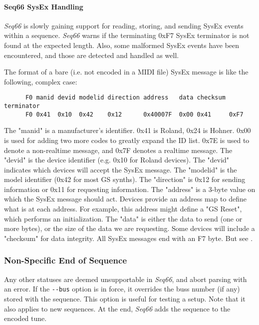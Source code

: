 \paragraph{Seq66 SysEx Handling}
\label{paragraph:midi_format_seq66_sysex_handling}

   \textsl{Seq66} is slowly gaining support for reading, storing, and
   sending SysEx events within a sequence.
   \textsl{Seq66} warns if the
   terminating 0xF7 SysEx terminator is not found at the expected length.
   Also, some malformed SysEx events have been encountered, and those are
   detected and handled as well.

   The format of a bare (i.e. not encoded in a MIDI file) SysEx message is
   like the following, complex case:

   \begin{verbatim}
      F0 manid devid modelid direction address   data checksum terminator
      F0 0x41  0x10  0x42    0x12      0x40007F  0x00 0x41     0xF7
   \end{verbatim}

   The "manid" is a manufacturer's identifier. 0x41 is Roland, 0x24 is
   Hohner. 0x00 is used for adding two more codes to greatly expand the ID
   list. 0x7E is used to denote a non-realtime message, and 0x7F denotes
   a realtime message.
   The "devid" is the device identifier (e.g. 0x10 for Roland devices).
   The "devid" indicates which devices will accept the SysEx message.
   The "modelid" is the model identifier (0x42 for most GS synths).
   The "direction" is 0x12 for sending information or 0x11 for requesting
   information.
   The "address" is a 3-byte value on which the SysEx message should act.
   Devices provide an address map to define what is at each address.
   For example, this address might define a "GS Reset", which performs
   an initialization.
   The "data" is either the data to send (one or more bytes), or the
   size of the data we are requesting.
   Some devices will include a "checksum" for data integrity.
   All SysEx messages end with an F7 byte.
   But see .

\subsubsection{Non-Specific End of Sequence}
\label{subsubsec:midi_format_meta_sequence_ends}

   Any other statuses are deemed unsupportable in \textsl{Seq66}, and
   abort parsing with an error.
   If the \texttt{-{}-bus} option is in force, it overrides the buss number (if
   any) stored with the sequence.  This option is useful for testing a setup.
   Note that it also applies to new sequences.
   At the end, \textsl{Seq66} adds the sequence to the encoded tune.

